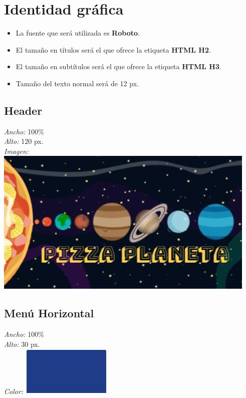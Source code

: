 
\section{Identidad gráfica}

\begin{itemize}
	\item La fuente que será utilizada es \textbf{Roboto}.
	\item El tamaño en títulos será el que ofrece la etiqueta \textbf{HTML H2}.
	\item El tamaño en subtítulos será el que ofrece la etiqueta \textbf{HTML H3}.
	\item Tamaño del texto normal será de 12 px.
\end{itemize}

\subsection{Header}

\noindent \textit{Ancho:} 100\%\\
\textit{Alto:} 120 px.\\
\textit{Imagen:} \includegraphics[scale=0.500]{imagenes/iconografia/Header.png}\\

\subsection{Menú Horizontal}

\noindent \textit{Ancho:} 100\%\\
\textit{Alto:} 30 px.\\
\textit{Color:} \includegraphics[scale=1]{imagenes/iconografia/ColorMenu.png}\\

